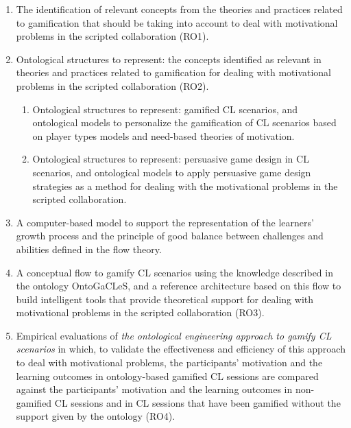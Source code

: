 \begin{enumerate}
\item 
The identification of relevant concepts from the theories and practices related to gamification that should be taking into account to deal with motivational problems in the scripted collaboration (RO1).

\item
Ontological structures to represent: the concepts identified as relevant in theories and practices related to gamification for dealing with motivational problems in the scripted collaboration (RO2).

\begin{enumerate}
\item
Ontological structures to represent: gamified CL scenarios, and ontological models to personalize the gamification of CL scenarios based on player types models and need-based theories of motivation.

\item
Ontological structures to represent: persuasive game design in CL scenarios, and ontological models to apply persuasive game design strategies as a method for dealing with the motivational problems in the scripted collaboration.
\end{enumerate}

\item 
A computer-based model to support the representation of the learners' growth process and the principle of good balance between challenges and abilities defined in the flow theory.

\item
A conceptual flow to gamify CL scenarios using the knowledge described in the ontology OntoGaCLeS, and a reference architecture based on this flow to build intelligent tools that provide theoretical support for dealing with motivational problems in the scripted collaboration (RO3).

\item
Empirical evaluations of \emph{the ontological engineering approach to gamify CL scenarios} in which, to validate the effectiveness and efficiency of this approach to deal with motivational problems, the participants' motivation and the learning outcomes in ontology-based gamified CL sessions are compared against the participants' motivation and the learning outcomes in non-gamified CL sessions and in CL sessions that have been gamified without the support given by the ontology (RO4).
\end{enumerate}

